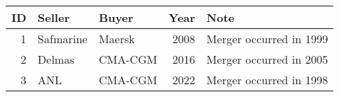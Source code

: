 
\begin{tabular}[t]{rllrl}
\toprule
ID & Seller & Buyer & Year & Note\\
\midrule
1 & Safmarine & Maersk & 2008 & Merger occurred in 1999\\
2 & Delmas & CMA-CGM & 2016 & Merger occurred in 2005\\
3 & ANL & CMA-CGM & 2022 & Merger occurred in 1998\\
\bottomrule
\end{tabular}
